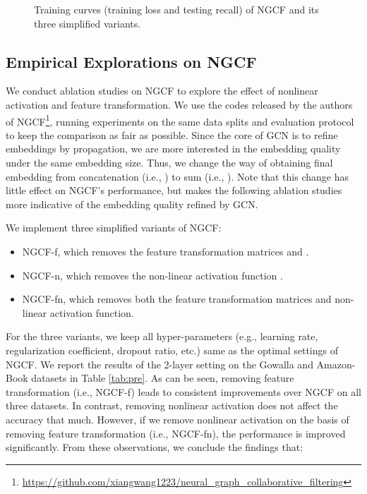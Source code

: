 \documentclass[sigconf]{acmart}
\theoremstyle{definition}
\begin{document}
\begin{figure*}[t]
	\centering
	\vspace{-15pt}
	\caption{Training curves (training loss and testing recall) of NGCF and its three simplified variants.} \vspace{-10pt}
	\label{fig:train-epochs}
\end{figure*}

\subsection{Empirical Explorations on NGCF} \label{ss:ngcf_study}
We conduct ablation studies on NGCF to explore the effect of nonlinear activation and feature transformation. We use the codes released by the authors of NGCF\footnote{\url{https://github.com/xiangwang1223/neural_graph_collaborative_filtering}}, running experiments on the same data splits and evaluation protocol to keep the comparison as fair as possible. 
Since the core of GCN is to refine embeddings by propagation, we are more interested in the embedding quality under the same embedding size. Thus, we change the way of obtaining final embedding from concatenation (i.e., ) to sum (i.e., ).
Note that this change has little effect on NGCF's performance, but makes the following ablation studies more indicative of the embedding quality refined by GCN. 

We implement three simplified variants of NGCF:
\begin{itemize}[leftmargin=*]
\item NGCF-f, which removes the feature transformation matrices  and .
\item NGCF-n, which removes the non-linear activation function .
\item NGCF-fn, which removes both the feature transformation matrices and non-linear activation function. 
\end{itemize}

For the three variants, we keep all hyper-parameters (e.g., learning rate, regularization coefficient, dropout ratio, etc.)  same as the optimal settings of NGCF. 
We report the results of the 2-layer setting on the Gowalla and Amazon-Book datasets in Table \ref{tab:pre}. 
As can be seen, removing feature transformation (i.e., NGCF-f) leads to consistent improvements over NGCF on all three datasets. In contrast, removing nonlinear activation does not affect the accuracy that much. However, if we remove nonlinear activation on the basis of removing feature transformation (i.e., NGCF-fn), the performance is improved significantly. From these observations, we conclude the findings that: 
\end{document}
